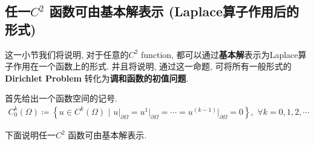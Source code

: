 \newpage

\subsection{任一$C^2$ 函数可由基本解表示 (Laplace算子作用后的形式)}
	这一小节我们将说明, 对于任意的$C^2$ function, 都可以通过\textbf{基本解}表示为Laplace算子作用在一个函数上的形式. 并且将说明, 通过这一命题, 可将所有一般形式的\textbf{Dirichlet Problem} 转化为\textbf{调和函数的初值问题}. 
	
	\vspace*{1em}
	
	\hspace{-1.95em}首先给出一个函数空间的记号. 
	\begin{align*}
		C_{0}^k (\Omega) \coloneqq \left\{ u \in C^k(\Omega) \,\, \Big| \,\, u\Big|_{\partial \Omega} = u^1 \Big|_{\partial \Omega} = \cdots = u^{(k - 1)} \Big|_{\partial \Omega} = 0 \right\} , \,\, \forall k = 0 , 1 , 2 , \cdots
	\end{align*}
	
	\hspace{-1.95em}下面说明任一$C^2$ 函数可由基本解表示. 
	
	\vspace{1em}
	
